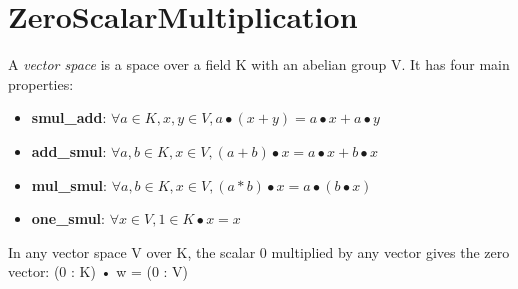 \section{ZeroScalarMultiplication}

\begin{definition}
  \label{definition : VectorSpace}
  \leanok
  A \emph{vector space} is a space over a field K with an abelian group V. It has four main properties:
  \begin{itemize}
    \item \textbf{smul\_add}:
    $\forall a \in K, x,y \in V , a \bullet (x + y) = a \bullet x + a \bullet y $
    \item \textbf{add\_smul}:
    $\forall a,b \in K, x \in V, (a + b) \bullet x = a \bullet x + b \bullet x $
    \item \textbf{mul\_smul}:
    $\forall a,b \in K, x \in V, (a * b) \bullet x = a \bullet (b \bullet x) $
    \item \textbf{one\_smul}:
    $\forall x \in V, 1 \in K \bullet x = x $
  \end{itemize}
\end{definition}

\begin{theorem}
  \label{theorem : zero_smul}
  \leanok
  In any vector space V over K, the scalar 0 multiplied by any vector gives the zero vector: (0 : K) • w = (0 : V)
\end{theorem}
